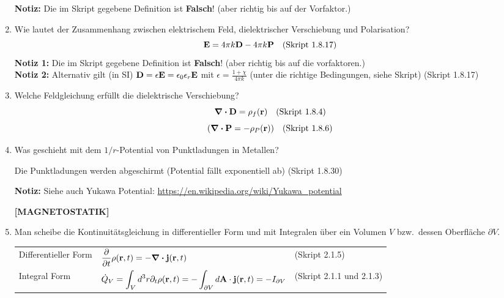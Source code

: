 \documentclass{scrartcl}
\newcommand{\ds}{\displaystyle}
\begin{document}
\begin{enumerate}
\begin{center}
\begin{tabular}{lll}
          \end{tabular}
          \end{center}
          \textbf{Notiz:} Die im Skript gegebene Definition ist 
          \textbf{Falsch}! (aber richtig bis auf der Vorfaktor.)\\

    \item Wie lautet der Zusammenhang zwischen elektrischem Feld, 
          dielektrischer Verschiebung und Polarisation?
          $$\vb E= 4\pi k\vb D - 4\pi k\vb P \quad\text{(Skript 1.8.17)}$$
          \textbf{Notiz 1:} Die im Skript gegebene Definition ist 
          \textbf{Falsch}! (aber richtig bis auf die vorfaktoren.)\\
          \textbf{Notiz 2:} Alternativ gilt (in SI) $\vb D=\epsilon \vb E
          =\epsilon_0\epsilon_r \vb E$ mit
          $\epsilon=\frac{1+\chi}{4\pi k}$ 
          (unter die richtige Bedingungen, siehe Skript) (Skript 1.8.17)\\

    \item Welche Feldgleichung erfüllt die dielektrische Verschiebung?
          $$\div \vb D=\rho_f(\vb r)\quad\text{(Skript 1.8.4)}$$
          $$\qty(\div \vb P=-\rho_P(\vb r))\quad\text{(Skript 1.8.6)}$$

    \item Was geschieht mit dem $1/r$-Potential von Punktladungen in
          Metallen?
          \begin{center}
            Die Punktladungen werden abgeschirmt (Potential fällt 
            exponentiell ab)
            (Skript 1.8.30)
          \end{center}
          \textbf{Notiz:} Siehe auch Yukawa Potential: 
          \url{https://en.wikipedia.org/wiki/Yukawa_potential} 

    \textbf{[MAGNETOSTATIK]}
    \item Man scheibe die Kontinuitätsgleichung in differentieller Form
          und mit Integralen über ein Volumen $V$ bzw.\ dessen Oberfläche 
          $\partial V$.
          \begin{center}
          \begin{tabular}{lll}
            Differentieller Form 
                              & $\ds\pdv{t}\rho(\vb r, t)=
                                 -\div\vb j(\vb r, t)$
                                & (Skript 2.1.5)\\
            Integral Form     & $\ds\dot Q_V
                                =\int_V d^3r\partial_t\rho(\vb r,t)=
                                -\int_{\partial V}d\vb A\cdot
                                \vb j(\vb r, t)=-I_{\partial V}$
                                & (Skript 2.1.1 und 2.1.3)\\
          \end{tabular}
          \end{center}


\end{enumerate}
\end{document}
